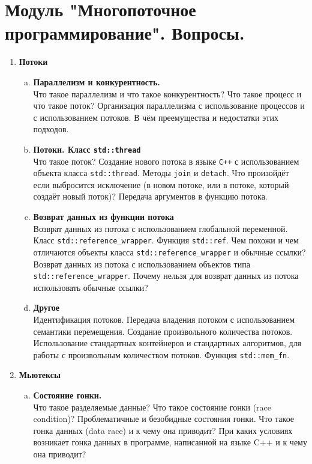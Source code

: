 \documentclass{article}
\begin{document}

\section*{Модуль "Многопоточное программирование". Вопросы.}
\begin{enumerate}



\item \textbf{Потоки}
\begin{enumerate}[a.]
\item \textbf{Параллелизм и конкурентность.}\\
Что такое параллелизм и что такое конкурентность? Что такое процесс и что такое поток? Организация параллелизма с использование процессов и с использованием потоков. В чём преемущества и недостатки этих подходов.

\item \textbf{Потоки. Класс \texttt{std::thread}}\\
Что такое поток? Создание нового потока в языке \texttt{C++} с использованием объекта класса \texttt{std::thread}. Методы \texttt{join} и \texttt{detach}. Что произойдёт если выбросится исключение (в новом потоке, или в потоке, который создаёт новый поток)?  Передача аргументов в функцию потока. 

\item \textbf{Возврат данных из функции потока}\\
Возврат данных из потока с использованием глобальной переменной. Класс \texttt{std::reference\_wrapper}. Функция \texttt{std::ref}. Чем похожи и чем отличаются объекты класса \texttt{std::reference\_wrapper} и обычные ссылки? Возврат данных из потока с использованием объектов типа \texttt{std::reference\_wrapper}. Почему нельзя для возврат данных из потока использовать обычные ссылки? 

\item \textbf{Другое}\\
Идентификация потоков. Передача владения потоком с использованием семантики перемещения. Создание произвольного количества потоков. Использование стандартных контейнеров и стандартных алгоритмов, для работы с произвольным количеством потоков. Функция \texttt{std::mem\_fn}.
\end{enumerate}


\item \textbf{Мьютексы}
\begin{enumerate}[a.]
\item \textbf{Состояние гонки.}\\
Что такое разделяемые данные? Что такое состояние гонки (race condition)? Проблематичные и безобидные состояния гонки. Что такое гонка данных (data race) и к чему она приводит? При каких условиях возникает гонка данных в программе, написанной на языке C++ и к чему она приводит?


\end{enumerate}
\end{enumerate}
\end{document}
